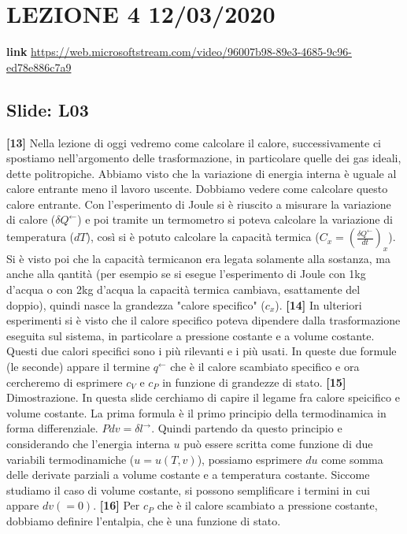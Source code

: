 \section*{LEZIONE 4 12/03/2020}
\textbf{link} \url{https://web.microsoftstream.com/video/96007b98-89e3-4685-9c96-ed78e886c7a9}
\subsection*{Slide: L03}
\textbf{[13]}\; Nella lezione di oggi vedremo come calcolare il calore, successivamente ci spostiamo nell'argomento delle trasformazione, in particolare quelle dei gas ideali, dette politropiche. Abbiamo visto che la variazione di energia interna è uguale al calore entrante meno il lavoro uscente. Dobbiamo vedere come calcolare questo calore entrante. Con l'esperimento di Joule si è riuscito a misurare la variazione di calore ($\delta Q^\leftarrow $) e poi tramite un termometro si poteva calcolare la variazione di temperatura ($dT$), così si è potuto calcolare la capacità termica ($C_x = \left(\frac{\delta Q^\leftarrow }{dt}\right)_x$). Si è visto poi che la capacità termicanon era legata solamente alla sostanza, ma anche alla qantità (per esempio se si esegue l'esperimento di Joule con 1kg d'acqua o con 2kg d'acqua la capacità termica cambiava, esattamente del doppio), quindi nasce la grandezza "calore specifico" ($c_x$).
\newline\textbf{[14]}\; In ulteriori esperimenti si è visto che il calore specifico poteva dipendere dalla trasformazione eseguita sul sistema, in particolare a pressione costante e a volume costante. Questi due calori specifici sono i più rilevanti e i più usati. In queste due formule (le seconde) appare il termine $q^\leftarrow $ che è il calore scambiato specifico e ora cercheremo di esprimere $c_V$ e $c_P$ in funzione di grandezze di stato.
\newline\textbf{[15]}\; Dimostrazione. In questa slide cerchiamo di capire il legame fra calore speicifico e volume costante. La prima formula è il primo principio della termodinamica in forma differenziale. $Pdv = \delta l^\rightarrow $. Quindi partendo da questo principio e considerando che l'energia interna $u$ può essere scritta come funzione di due variabili termodinamiche ($u = u(T,v)$), possiamo esprimere $du$ come somma delle derivate parziali a volume costante e a temperatura costante. Siccome studiamo il caso di volume costante, si possono semplificare i termini in cui appare $dv (=0)$.
\newline\textbf{[16]}\; Per $c_P$ che è il  calore scambiato a pressione costante, dobbiamo definire l'entalpia, che è una funzione di stato.
